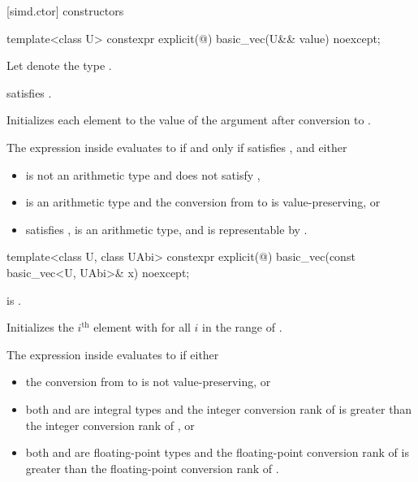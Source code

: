 [simd.ctor]{ constructors}

\begin{itemdecl}
template<class U> constexpr explicit(@\seebelow@) basic_vec(U&& value) noexcept;
\end{itemdecl}

\begin{itemdescr}
\pnum
Let  denote the type .

\pnum
\constraints
{} satisfies .

\pnum
\effects
Initializes each element to the value of the argument after conversion to
.

\pnum
\remarks
The expression inside  evaluates to  if and only if
 satisfies , and either
\begin{itemize}
 \item
    is not an arithmetic type and does not satisfy
   ,
 \item
    is an arithmetic type and the conversion from  to
    is value-preserving, or
 \item
    satisfies ,
    is an arithmetic type, and
    is representable by .
\end{itemize}
\end{itemdescr}

\begin{itemdecl}
template<class U, class UAbi>
  constexpr explicit(@\seebelow@) basic_vec(const basic_vec<U, UAbi>& x) noexcept;
\end{itemdecl}

\begin{itemdescr}
\pnum
\constraints
{} is .

\pnum
\effects
Initializes the $i^\text{th}$ element with  for
all $i$ in the range of .

\pnum
\remarks
The expression inside  evaluates to  if either
\begin{itemize}
 \item
   the conversion from  to  is not value-preserving,
   or
 \item
   both  and  are integral types and the integer
   conversion rank of  is greater than the integer
   conversion rank of , or
 \item
   both  and  are floating-point types and the
   floating-point conversion rank of  is greater than
   the floating-point conversion rank of .
\end{itemize}
\end{itemdescr}

